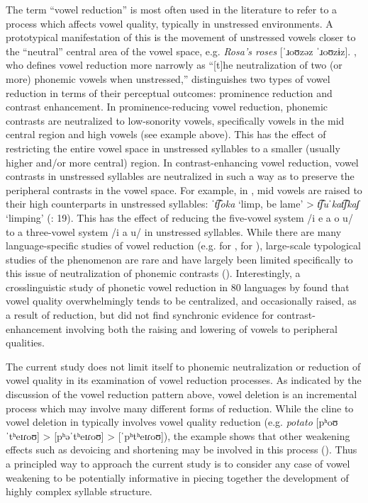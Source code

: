   The term ``vowel reduction'' is most often used in the literature to refer to a process which affects vowel quality, typically in unstressed environments. A prototypical manifestation of this is the movement of unstressed vowels closer to the ``neutral'' central area of the vowel space, e.g.  \textit{Rosa’s roses} [\textit{ˈ}ɹoʊzəz \textit{ˈ}ɹoʊzɨz]. \citet[1]{Crosswhite2000}, who defines vowel reduction more narrowly as “[t]he neutralization of two (or more) phonemic vowels when unstressed,” distinguishes two types of vowel reduction in terms of their perceptual outcomes: prominence reduction and contrast enhancement. In prominence-reducing vowel reduction, phonemic contrasts are neutralized to low-sonority vowels, specifically vowels in the mid central region and high vowels (see  example above). This has the effect of restricting the entire vowel space in unstressed syllables to a smaller (usually higher and/or more central) region. In contrast-enhancing vowel reduction, vowel contrasts in unstressed syllables are neutralized in such a way as to preserve the peripheral contrasts in the vowel space. For example, in , mid vowels are raised to their high counterparts in unstressed syllables: \textit{ˈt͡ʃoka} ‘limp, be lame’ > \textit{t͡ʃuˈkat͡ʃkaʃ} ‘limping’ (\citealt{MunroBenson1973}: 19). This has the effect of reducing the five-vowel system /i e a o u/ to a three-vowel system /i a u/ in unstressed syllables. While there are many language-specific studies of vowel reduction (e.g. \citealt{Lindblom1963} for , \citealt{PadgettTabain2005} for ), large-scale typological studies of the phenomenon are rare and have largely been limited specifically to this issue of neutralization of phonemic contrasts (\citealt{Crosswhite2001,Crosswhite2004,Barnes2006}). Interestingly, a crosslinguistic study of phonetic vowel reduction in 80 languages by \citet{KapatsinskiEtAl2019} found that vowel quality overwhelmingly tends to be centralized, and occasionally raised, as a result of reduction, but did not find synchronic evidence for contrast-enhancement involving both the raising and lowering of vowels to peripheral qualities.

  The current study does not limit itself to phonemic neutralization or reduction of vowel quality in its examination of vowel reduction processes. As indicated by the discussion of the  vowel reduction pattern above, vowel deletion is an incremental process which may involve many different forms of reduction. While the cline to vowel deletion in  typically involves vowel quality reduction (e.g. \textit{potato} [pʰoʊˈtʰeɪɾoʊ] > [pʰəˈtʰeɪɾoʊ] > [ˈpʰtʰeɪɾoʊ]), the  example shows that other weakening effects such as devoicing and shortening may be involved in this process (\citealt{ChitoranBabaliyeva2007}). Thus a principled way to approach the current study is to consider any case of vowel weakening to be potentially informative in piecing together the development of highly complex syllable structure.

